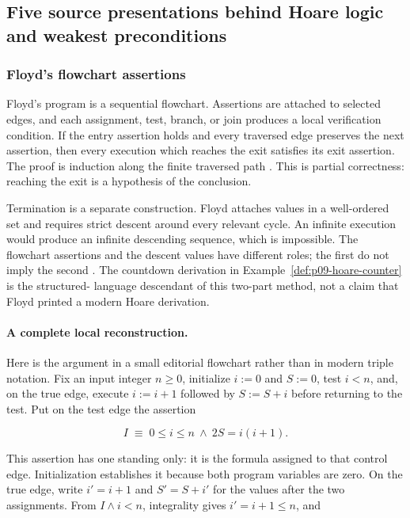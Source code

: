 
\subsection{Five source presentations behind Hoare logic and weakest preconditions}
\label{sec:p09-presentation-n-c-019}

\subsubsection{Floyd's flowchart assertions}

Floyd's program is a sequential flowchart.  Assertions are attached to selected
edges, and each assignment, test, branch, or join produces a local verification
condition.  If the entry assertion holds and every traversed edge preserves the
next assertion, then every execution which reaches the exit satisfies its exit
assertion.  The proof is induction along the finite traversed path
\cite[pp.~19--24]{Floyd1967}.  This is partial correctness: reaching the exit is
a hypothesis of the conclusion.

Termination is a separate construction.  Floyd attaches values in a
well-ordered set and requires strict descent around every relevant cycle.  An
infinite execution would produce an infinite descending sequence, which is
impossible.  The flowchart assertions and the descent values have different
roles; the first do not imply the second \cite[pp.~26--31]{Floyd1967}.  The
countdown derivation in Example~\ref{def:p09-hoare-counter} is the structured-
language descendant of this two-part method, not a claim that Floyd printed a
modern Hoare derivation.

\paragraph{A complete local reconstruction.}
Here is the argument in a small editorial flowchart rather than in modern
triple notation.  Fix an input integer \(n\geq 0\), initialize \(i:=0\) and
\(S:=0\), test \(i<n\), and, on the true edge, execute \(i:=i+1\) followed by
\(S:=S+i\) before returning to the test.  Put on the test edge the assertion

\[
 I\;\equiv\;0\leq i\leq n\ \land\ 2S=i(i+1).
\]

This assertion has one standing only: it is the formula assigned to that
control edge.  Initialization establishes it because both program variables
are zero.  On the true edge, write \(i'=i+1\) and \(S'=S+i'\) for the values
after the two assignments.  From \(I\land i<n\), integrality gives
\(i'=i+1\leq n\), and

